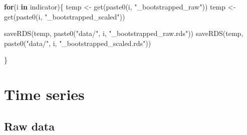\documentclass[
]{book}
\newenvironment{Shaded}{\begin{snugshade}}{\end{snugshade}}
\newcommand{\ControlFlowTok}[1]{\textcolor[rgb]{0.13,0.29,0.53}{\textbf{#1}}}
\newcommand{\FunctionTok}[1]{\textcolor[rgb]{0.00,0.00,0.00}{#1}}
\newcommand{\NormalTok}[1]{#1}
\newcommand{\OtherTok}[1]{\textcolor[rgb]{0.56,0.35,0.01}{#1}}
\newcommand{\StringTok}[1]{\textcolor[rgb]{0.31,0.60,0.02}{#1}}
\begin{document}
\begin{Shaded}
\begin{Highlighting}[]

\ControlFlowTok{for}\NormalTok{(i }\ControlFlowTok{in}\NormalTok{ indicator)\{}
\NormalTok{  temp }\OtherTok{\textless{}{-}} \FunctionTok{get}\NormalTok{(}\FunctionTok{paste0}\NormalTok{(i, }\StringTok{"\_bootstrapped\_raw"}\NormalTok{))}
\NormalTok{    temp }\OtherTok{\textless{}{-}} \FunctionTok{get}\NormalTok{(}\FunctionTok{paste0}\NormalTok{(i, }\StringTok{"\_bootstrapped\_scaled"}\NormalTok{))}

  \FunctionTok{saveRDS}\NormalTok{(temp, }\FunctionTok{paste0}\NormalTok{(}\StringTok{"data/"}\NormalTok{, i, }\StringTok{"\_bootstrapped\_raw.rds"}\NormalTok{))}
    \FunctionTok{saveRDS}\NormalTok{(temp, }\FunctionTok{paste0}\NormalTok{(}\StringTok{"data/"}\NormalTok{, i, }\StringTok{"\_bootstrapped\_scaled.rds"}\NormalTok{))}

\NormalTok{\}}
\end{Highlighting}
\end{Shaded}

\hypertarget{cross}{%
\chapter{Time series}\label{cross}}

\hypertarget{raw-data}{%
\section{Raw data}\label{raw-data}}
\end{document}
